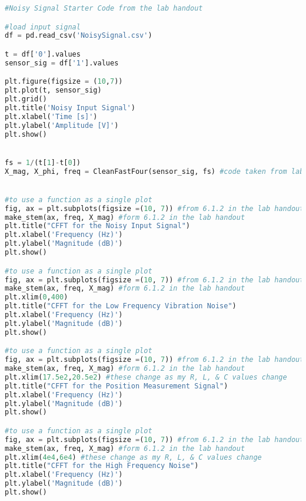 \documentclass[12pt]{report}
\begin{document}
\begin{lstlisting}[language=Python]
#Noisy Signal Starter Code from the lab handout

#load input signal
df = pd.read_csv('NoisySignal.csv')

t = df['0'].values
sensor_sig = df['1'].values

plt.figure(figsize = (10,7))
plt.plot(t, sensor_sig)
plt.grid()
plt.title('Noisy Input Signal')
plt.xlabel('Time [s]')
plt.ylabel('Amplitude [V]')
plt.show()


fs = 1/(t[1]-t[0])
X_mag, X_phi, freq = CleanFastFour(sensor_sig, fs) #code taken from lab 9


#to use a function as a single plot
fig, ax = plt.subplots(figsize =(10, 7)) #from 6.1.2 in the lab handout
make_stem(ax, freq, X_mag) #form 6.1.2 in the lab handout
plt.title("CFFT for the Noisy Input Signal")
plt.xlabel('Frequency (Hz)')
plt.ylabel('Magnitude (dB)')
plt.show()

#to use a function as a single plot
fig, ax = plt.subplots(figsize =(10, 7)) #from 6.1.2 in the lab handout
make_stem(ax, freq, X_mag) #form 6.1.2 in the lab handout
plt.xlim(0,400) 
plt.title("CFFT for the Low Frequency Vibration Noise")
plt.xlabel('Frequency (Hz)')
plt.ylabel('Magnitude (dB)')
plt.show()

#to use a function as a single plot
fig, ax = plt.subplots(figsize =(10, 7)) #from 6.1.2 in the lab handout
make_stem(ax, freq, X_mag) #form 6.1.2 in the lab handout
plt.xlim(17.5e2,20.5e2) #these change as my R, L, & C values change
plt.title("CFFT for the Position Measurement Signal")
plt.xlabel('Frequency (Hz)')
plt.ylabel('Magnitude (dB)')
plt.show()

#to use a function as a single plot
fig, ax = plt.subplots(figsize =(10, 7)) #from 6.1.2 in the lab handout
make_stem(ax, freq, X_mag) #form 6.1.2 in the lab handout
plt.xlim(4e4,6e4) #these change as my R, L, & C values change
plt.title("CFFT for the High Frequency Noise")
plt.xlabel('Frequency (Hz)')
plt.ylabel('Magnitude (dB)')
plt.show()

\end{lstlisting}
\end{document}
